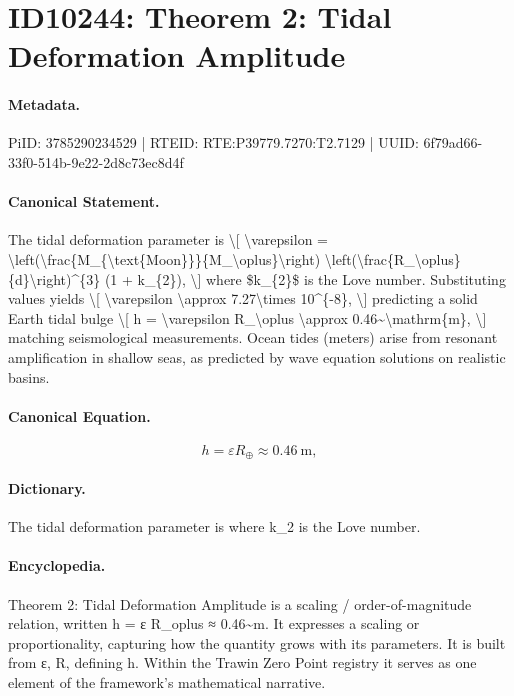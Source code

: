 \section*{ID10244: Theorem 2: Tidal Deformation Amplitude}
\paragraph{Metadata.}
PiID: 3785290234529 | RTEID: RTE:P39779.7270:T2.7129 | UUID: 6f79ad66-33f0-514b-9e22-2d8c73ec8d4f

\paragraph{Canonical Statement.}
The tidal deformation parameter is \textbackslash{}[ \textbackslash{}varepsilon = \textbackslash{}left(\textbackslash{}frac\{M\_\{\textbackslash{}text\{Moon\}\}\}\{M\_\textbackslash{}oplus\}\textbackslash{}right) \textbackslash{}left(\textbackslash{}frac\{R\_\textbackslash{}oplus\}\{d\}\textbackslash{}right)\textasciicircum{}\{3\} (1 + k\_\{2\}), \textbackslash{}] where \$k\_\{2\}\$ is the Love number. Substituting values yields \textbackslash{}[ \textbackslash{}varepsilon \textbackslash{}approx 7.27\textbackslash{}times 10\textasciicircum{}\{-8\}, \textbackslash{}] predicting a solid Earth tidal bulge \textbackslash{}[ h = \textbackslash{}varepsilon R\_\textbackslash{}oplus \textbackslash{}approx 0.46\textasciitilde{}\textbackslash{}mathrm\{m\}, \textbackslash{}] matching seismological measurements. Ocean tides (meters) arise from resonant amplification in shallow seas, as predicted by wave equation solutions on realistic basins.

\paragraph{Canonical Equation.}
\[
h = \varepsilon R_\oplus \approx 0.46~\mathrm{m},
\]

\paragraph{Dictionary.}
The tidal deformation parameter is where k\_2 is the Love number.

\paragraph{Encyclopedia.}
Theorem 2: Tidal Deformation Amplitude is a scaling / order-of-magnitude relation, written h = ε R\_oplus ≈ 0.46\textasciitilde{}m. It expresses a scaling or proportionality, capturing how the quantity grows with its parameters. It is built from ε, R, defining h. Within the Trawin Zero Point registry it serves as one element of the framework's mathematical narrative.

